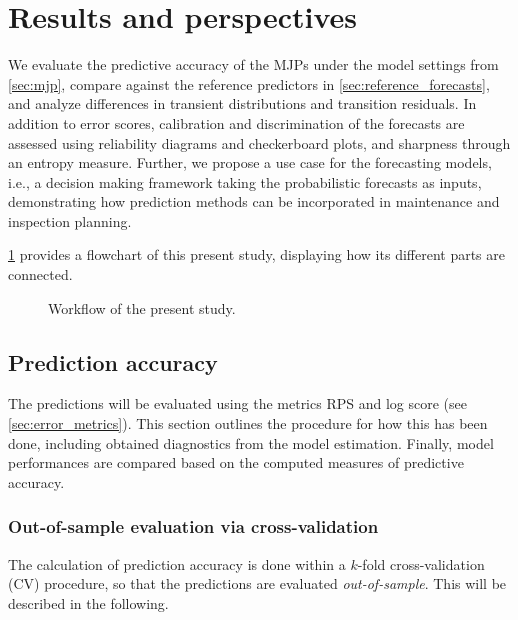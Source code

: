 

\section{Results and perspectives} \label{sec:results}
We evaluate the predictive accuracy of the MJPs under the model settings from \cref{sec:mjp}, compare against the reference predictors in \cref{sec:reference_forecasts}, and analyze differences in transient distributions and transition residuals. In addition to error scores, calibration and discrimination of the forecasts are assessed using reliability diagrams and checkerboard plots, and sharpness through an entropy measure. Further, we propose a use case for the forecasting models, i.e., a decision making framework taking the probabilistic forecasts as inputs, demonstrating how prediction methods can be incorporated in maintenance and inspection planning.

\cref{fig:flowchart} provides a flowchart of this present study, displaying how its different parts  are connected.

\begin{figure}[h!]
\centering

\caption{Workflow of the present study.} \label{fig:flowchart}
\end{figure}


\subsection{Prediction accuracy} \label{sec:prediction_error}
The predictions will be evaluated using the metrics RPS and log score (see \cref{sec:error_metrics}). This section outlines the procedure for how this has been done, including obtained diagnostics from the model estimation. Finally, model performances are compared based on the computed measures of predictive accuracy.

\subsubsection{Out-of-sample evaluation via cross-validation} \label{sec:CV}
The calculation of prediction accuracy is done within a $k$-fold cross-validation (CV) procedure, so that the predictions are evaluated \textit{out-of-sample}. This will be described in the following.

